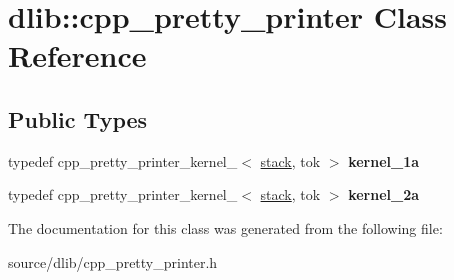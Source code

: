 \hypertarget{classdlib_1_1cpp__pretty__printer}{
\section{dlib::cpp\_\-pretty\_\-printer Class Reference}
\label{classdlib_1_1cpp__pretty__printer}
}
\subsection*{Public Types}
\begin{DoxyCompactItemize}
\item 
\hypertarget{classdlib_1_1cpp__pretty__printer_a990595778cddb7e3683a1643663f0605}{
typedef cpp\_\-pretty\_\-printer\_\-kernel\_$<$ \hyperlink{classdlib_1_1stack}{stack}, tok $>$ {\bfseries kernel\_\-1a}}
\label{classdlib_1_1cpp__pretty__printer_a990595778cddb7e3683a1643663f0605}

\item 
\hypertarget{classdlib_1_1cpp__pretty__printer_a6f68d38cc9db1c5b82158044c4fbd96e}{
typedef cpp\_\-pretty\_\-printer\_\-kernel\_$<$ \hyperlink{classdlib_1_1stack}{stack}, tok $>$ {\bfseries kernel\_\-2a}}
\label{classdlib_1_1cpp__pretty__printer_a6f68d38cc9db1c5b82158044c4fbd96e}

\end{DoxyCompactItemize}


The documentation for this class was generated from the following file:\begin{DoxyCompactItemize}
\item 
source/dlib/cpp\_\-pretty\_\-printer.h\end{DoxyCompactItemize}

